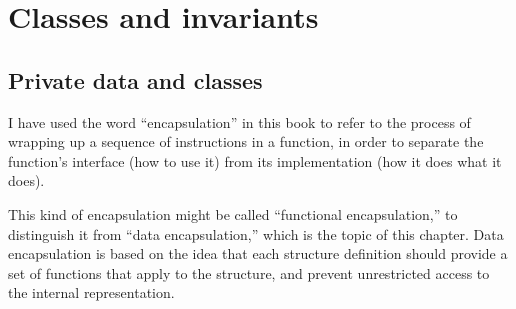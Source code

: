 





\chapter{Classes and invariants}
\label{class}

\section{Private data and classes}

I have used the word ``encapsulation'' in this book to refer
to the process of wrapping up a sequence of instructions in
a function, in order to separate the function's interface (how
to use it) from its implementation (how it does what it does).

This kind of encapsulation might be called ``functional
encapsulation,'' to distinguish it from ``data encapsulation,'' which
is the topic of this chapter.  Data encapsulation is based on the idea
that each structure definition should provide a set of functions that
apply to the structure, and prevent unrestricted access to the
internal representation.

